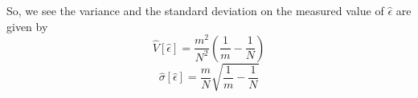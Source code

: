 \documentclass[12]{article}
\begin{document}
So, we see the variance and the standard deviation on the measured value of $\hat{\epsilon}$ are given by
\begin{equation}
  \boxed{
    \hat{V}\left[ \hat{\epsilon} \right]
    = \frac{m^2}{N^2}\left(\frac{1}{m}-\frac{1}{N}\right)
  }
\end{equation}
\begin{equation}
  \boxed{
    \hat{\sigma}\left[ \hat{\epsilon} \right]
    = \frac{m}{N}\sqrt{ \frac{1}{m}-\frac{1}{N} }
  }
\end{equation}
\end{document}
